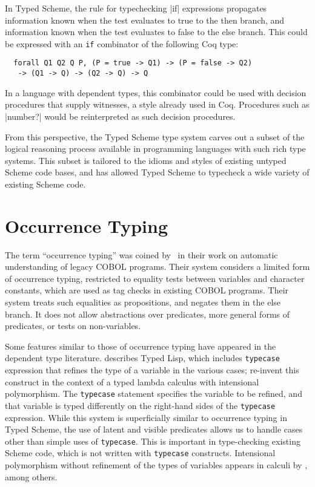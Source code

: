 \begin{schemeregion}
In Typed Scheme, the rule for typechecking \scheme|if| expressions
propagates information known when the test evaluates
to true to the then branch, and information known when the test
evaluates to false to the else branch.  This could be expressed with
an \verb|if| combinator of the following Coq type:

\begin{verbatim}
  forall Q1 Q2 Q P, (P = true -> Q1) -> (P = false -> Q2) 
   -> (Q1 -> Q) -> (Q2 -> Q) -> Q
\end{verbatim}
\noindent
In a language with dependent types, this combinator could be used with
decision procedures that supply witnesses, a style already used in
Coq.  Procedures such as \scheme|number?| would be reinterpreted as
such decision procedures.  

From this perspective, the Typed Scheme type system
carves out a subset of the logical reasoning process available in 
 programming languages with such rich type systems.  This subset is tailored to the idioms and
styles of existing untyped Scheme code bases, and has allowed Typed Scheme to
typecheck a wide variety of existing Scheme code.

\section{Occurrence Typing}

The term ``occurrence typing'' was coined by~\citet{krcf:occurrence}
in their work on automatic understanding of legacy COBOL programs.
Their system considers a limited
form of occurrence typing, restricted to equality tests between
variables and character constants, which are used as tag checks in
existing COBOL programs.  Their system treats such
equalities as propositions, and negates them in the else branch.  It
does not allow abstractions over predicates, more general forms of
predicates, or tests on non-variables. 

Some features similar to those of occurrence typing have appeared in the dependent
type literature. \citet{c:typed-lisp} describes Typed Lisp, which includes
{\texttt{typecase}} expression that refines the type of a variable in the
various cases; \citet{weirich98} re-invent this construct in the context of
a typed lambda calculus with intensional polymorphism.  The
{\texttt{typecase}} statement specifies the variable to be refined, and
that variable is typed differently on the right-hand sides of the
\texttt{typecase} expression.  While this system is superficially similar
to occurrence typing in Typed Scheme, the use of latent and visible predicates allows us
to handle cases other than simple uses of \texttt{typecase}.  This is important
in type-checking existing Scheme code, which is not written with
\texttt{typecase} constructs. 
Intensional
polymorphism without refinement of the types of variables appears in
calculi by \citet{harper95compiling}, among others. 



\end{schemeregion}
